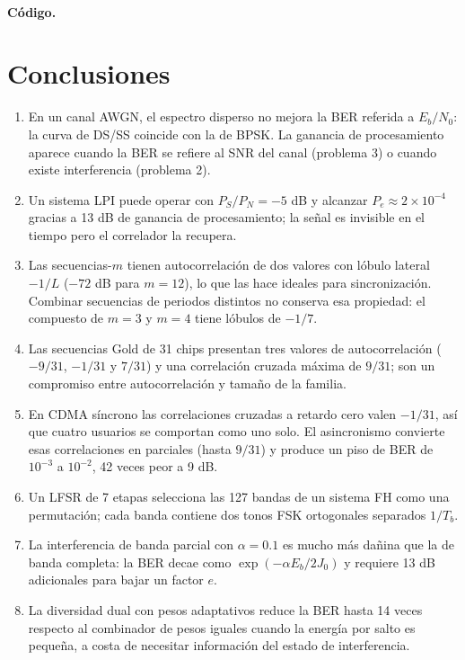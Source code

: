 \documentclass[11pt,a4paper]{article}
\newcommand{\listado}[1]{%
  \VerbatimInput[fontsize=\scriptsize,breaklines=true,breakanywhere=true,
    frame=single,framesep=2pt,rulecolor=\color{gray!50},numbers=left,
    numbersep=4pt]{#1}}
\begin{document}
\paragraph{Código.}
\listado{problema11.m}

\section{Conclusiones}

\begin{enumerate}
  \item En un canal AWGN, el espectro disperso no mejora la BER referida a
        $E_b/N_0$: la curva de DS/SS coincide con la de BPSK. La ganancia de
        procesamiento aparece cuando la BER se refiere al SNR del canal
        (problema 3) o cuando existe interferencia (problema 2).
  \item Un sistema LPI puede operar con $P_S/P_N=-5$ dB y alcanzar
        $P_e\approx2\times10^{-4}$ gracias a 13 dB de ganancia de procesamiento;
        la señal es invisible en el tiempo pero el correlador la recupera.
  \item Las secuencias-$m$ tienen autocorrelación de dos valores con lóbulo
        lateral $-1/L$ ($-72$ dB para $m=12$), lo que las hace ideales para
        sincronización. Combinar secuencias de periodos distintos no conserva
        esa propiedad: el compuesto de $m=3$ y $m=4$ tiene lóbulos de $-1/7$.
  \item Las secuencias Gold de 31 chips presentan tres valores de
        autocorrelación ($-9/31$, $-1/31$ y $7/31$) y una correlación cruzada
        máxima de $9/31$; son un compromiso entre autocorrelación y tamaño de la
        familia.
  \item En CDMA síncrono las correlaciones cruzadas a retardo cero valen
        $-1/31$, así que cuatro usuarios se comportan como uno solo. El
        asincronismo convierte esas correlaciones en parciales (hasta $9/31$) y
        produce un piso de BER de $10^{-3}$ a $10^{-2}$, 42 veces peor a 9 dB.
  \item Un LFSR de 7 etapas selecciona las 127 bandas de un sistema FH como una
        permutación; cada banda contiene dos tonos FSK ortogonales separados
        $1/T_b$.
  \item La interferencia de banda parcial con $\alpha=0.1$ es mucho más dañina
        que la de banda completa: la BER decae como $\exp(-\alpha E_b/2J_0)$ y
        requiere 13 dB adicionales para bajar un factor $e$.
  \item La diversidad dual con pesos adaptativos reduce la BER hasta 14 veces
        respecto al combinador de pesos iguales cuando la energía por salto es
        pequeña, a costa de necesitar información del estado de interferencia.
\end{enumerate}
\end{document}
